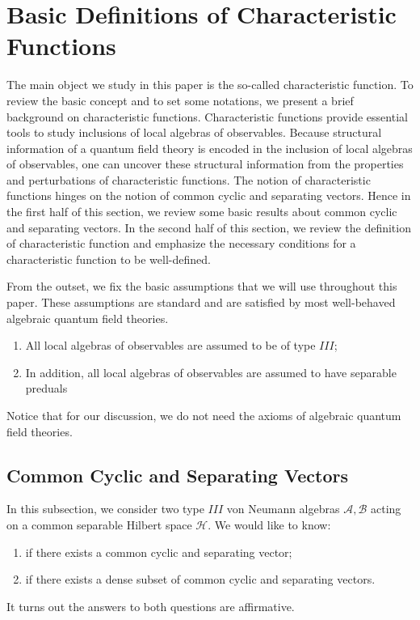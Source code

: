 \documentclass[a4paper,11pt]{article}
\theoremstyle{definition}
\begin{document}
\section{Basic Definitions of Characteristic Functions}\label{section:basics}
The main object we study in this paper is the so-called characteristic function\cite{revolutionizing}. To review the basic concept and to set some notations, we present a brief background on characteristic functions. Characteristic functions provide essential tools to study inclusions of local algebras of observables. Because structural information of a quantum field theory is encoded in the inclusion of local algebras of observables\cite{haag2012local}, one can uncover these structural information from the properties and perturbations of characteristic functions. The notion of characteristic functions hinges on the notion of common cyclic and separating vectors. Hence in the first half of this section, we review some basic results about common cyclic and separating vectors. In the second half of this section, we review the definition of characteristic function and emphasize the necessary conditions for a characteristic function to be well-defined.

From the outset, we fix the basic assumptions that we will use throughout this paper. These assumptions are standard and are satisfied by most well-behaved algebraic quantum field theories.
\begin{enumerate}
    \item All local algebras of observables are assumed to be of type $III$;
    \item In addition, all local algebras of observables are assumed to have separable preduals
\end{enumerate}
Notice that for our discussion, we do not need the axioms of algebraic quantum field theories.
\subsection{Common Cyclic and Separating Vectors}\label{subsection:common}
In this subsection, we consider two type $III$ von Neumann algebras $\mathcal{A},\mathcal{B}$ acting on a common separable Hilbert space $\mathcal{H}$. We would like to know:
\begin{enumerate}
    \item if there exists a common cyclic and separating vector;
    \item if there exists a dense subset of common cyclic and separating vectors.
\end{enumerate}
It turns out the answers to both questions are affirmative.
\end{document}
